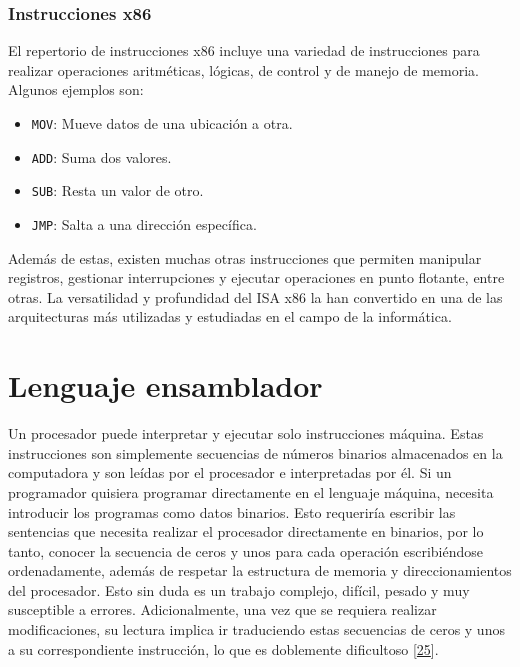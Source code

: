 \documentclass[12pt,twoside]{templates/unerthesis}
\providecommand{\tightlist}{%
  \setlength{\itemsep}{0pt}\setlength{\parskip}{0pt}}
\begin{document}
\hypertarget{instrucciones-x86}{%
\subsubsection{Instrucciones x86}\label{instrucciones-x86}}

El repertorio de instrucciones x86 incluye una variedad de instrucciones para realizar operaciones aritméticas, lógicas, de control y de manejo de memoria. Algunos ejemplos son:

\begin{itemize}
\tightlist
\item
  \texttt{MOV}: Mueve datos de una ubicación a otra.
\item
  \texttt{ADD}: Suma dos valores.
\item
  \texttt{SUB}: Resta un valor de otro.
\item
  \texttt{JMP}: Salta a una dirección específica.
\end{itemize}

Además de estas, existen muchas otras instrucciones que permiten manipular registros, gestionar interrupciones y ejecutar operaciones en punto flotante, entre otras. La versatilidad y profundidad del ISA x86 la han convertido en una de las arquitecturas más utilizadas y estudiadas en el campo de la informática.

\hypertarget{lenguaje-ensamblador}{%
\section{Lenguaje ensamblador}\label{lenguaje-ensamblador}}

Un procesador puede interpretar y ejecutar solo instrucciones máquina. Estas instrucciones son simplemente secuencias de números binarios almacenados en la computadora y son leídas por el procesador e interpretadas por él. Si un programador quisiera programar directamente en el lenguaje máquina, necesita introducir los programas como datos binarios. Esto requeriría escribir las sentencias que necesita realizar el procesador directamente en binarios, por lo tanto, conocer la secuencia de ceros y unos para cada operación escribiéndose ordenadamente, además de respetar la estructura de memoria y direccionamientos del procesador. Esto sin duda es un trabajo complejo, difícil, pesado y muy susceptible a errores. Adicionalmente, una vez que se requiera realizar modificaciones, su lectura implica ir traduciendo estas secuencias de ceros y unos a su correspondiente instrucción, lo que es doblemente dificultoso {[}\protect\hyperlink{ref-irvine2011assembly}{25}{]}.
\end{document}
